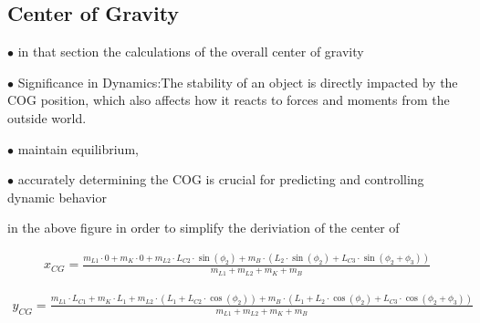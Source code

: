 \begin{itemize}
	\subsection{Center of Gravity } 
	$\bullet$ in that section the calculations of the overall center of gravity 
	
	$\bullet$ Significance in Dynamics:The stability of an object is directly impacted by the COG position, which also affects how it reacts to forces and moments from the outside world.
	
	$\bullet$ maintain equilibrium, 
	
	$\bullet$ accurately determining the COG is crucial for predicting and controlling dynamic behavior
	
	
	in the above figure in order to simplify the deriviation of the center of 
	
	\begin{equation}
		\begin{aligned}
			x_{CG} = \frac{m_{L1} \cdot 0 + m_K \cdot 0 + m_{L2} \cdot L_{C2} \cdot \sin(\phi_2) + m_B \cdot (L_2 \cdot \sin(\phi_2) + L_{C3} \cdot \sin(\phi_2 + \phi_3))}{m_{L1} + m_{L2} + m_K + m_B}
		\end{aligned}
	\end{equation}
	
	\begin{equation}
		\begin{aligned}
			y_{CG} = \frac{m_{L1} \cdot L_{C1} + m_K \cdot L_1 + m_{L2} \cdot (L_1 + L_{C2} \cdot \cos(\phi_2)) + m_B \cdot (L_1 + L_2 \cdot \cos(\phi_2) + L_{C3} \cdot \cos(\phi_2 + \phi_3))}{m_{L1} + m_{L2} + m_K + m_B}
		\end{aligned}
	\end{equation}
	
	

\end{itemize}
